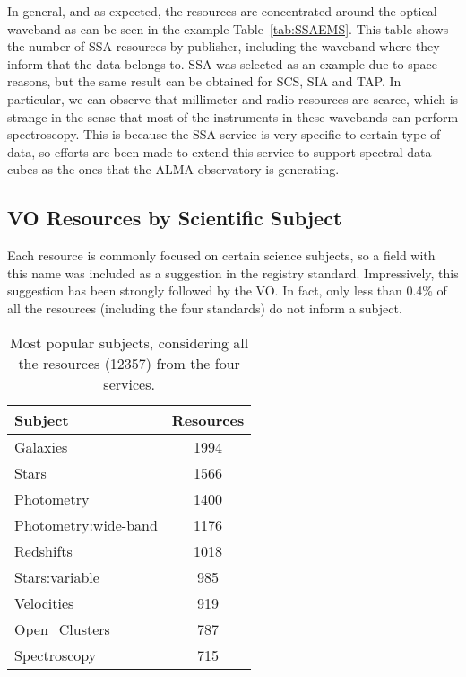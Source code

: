 In general, and as expected, the resources are concentrated around the optical waveband as can be
seen in the example Table~\ref{tab:SSAEMS}. This table shows the number of SSA resources by publisher,
including the waveband where they inform that the data belongs to. SSA was selected as an example due to
space reasons, but the same result can be obtained for SCS, SIA and TAP. In particular, we can observe that
millimeter and radio resources are scarce, which is strange in the sense that most of the instruments in these
wavebands can perform spectroscopy. This is because the SSA service is very specific to certain type of
data, so efforts are been made to extend this service to support spectral data cubes as the ones that
the ALMA observatory is generating. 

\subsection{VO Resources by Scientific Subject}

Each resource is commonly focused on certain science subjects, so a field with this name was included
as a suggestion in the registry standard. Impressively, this suggestion has been strongly followed by the VO.
In fact, only less than 0.4\% of all the resources (including the four standards) do not inform a subject. 

\begin{table}
\begin{center}
\begin{tabular}{|l|c|}
\hline
\textbf{Subject} & \textbf{Resources} \\
\hline
Galaxies  &  1994  \\
Stars  &  1566  \\
Photometry  &  1400  \\
Photometry:wide-band  &  1176  \\
Redshifts  &  1018  \\
Stars:variable  &  985  \\
Velocities  &  919  \\
Open\_Clusters  &  787  \\
Spectroscopy  &  715  \\
\hline
\end{tabular}
\caption{Most popular subjects, considering all the resources (12357) from the four services.}
\label{tab:resSub}
\end{center}
\end{table}

